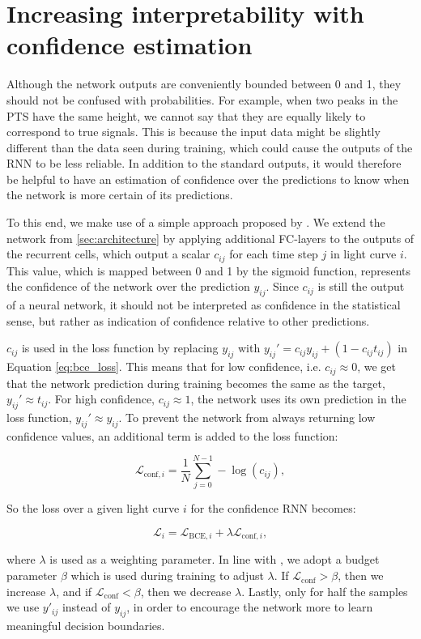 
\section{Increasing interpretability with confidence estimation}

Although the network outputs are conveniently bounded between 0 and 1, they should not be confused with probabilities. For example, when two peaks in the PTS have the same height, we cannot say that they are equally likely to correspond to true signals. This is because the input data might be slightly different than the data seen during training, which could cause the outputs of the RNN to be less reliable. In addition to the standard outputs, it would therefore be helpful to have an estimation of confidence over the predictions to know when the network is more certain of its predictions.

To this end, we make use of a simple approach proposed by \cite{devries2018learning}. We extend the network from \ref{sec:architecture} by applying additional FC-layers to the outputs of the recurrent cells, which output a scalar $c_{ij}$ for each time step $j$ in light curve $i$. This value, which is mapped between 0 and 1 by the sigmoid function, represents the confidence of the network over the prediction $y_{ij}$. Since $c_{ij}$ is still the output of a neural network, it should not be interpreted as confidence in the statistical sense, but rather as indication of confidence relative to other predictions. 

$c_{ij}$ is used in the loss function by replacing $y_{ij}$ with $y_{ij}' = c_{ij} y_{ij} +  (1-c_{ij} t_{ij})$ in Equation \ref{eq:bce_loss}. This means that for low confidence, i.e. $c_{ij} \approx 0$, we get that the network prediction during training becomes the same as the target, $y_{ij}' \approx t_{ij}$. For high confidence, $c_{ij} \approx 1$, the network uses its own prediction in the loss function, $y_{ij}' \approx y_{ij}$. To prevent the network from always returning low confidence values, an additional term is added to the loss function: 

\begin{equation}
    \mathcal{L}_{\text{conf},i} = 
    \frac{1}{N}\sum^{N-1}_{j=0} -\log(c_{ij}),
\end{equation}

\noindent So the loss over a given light curve $i$ for the confidence RNN becomes:

\begin{equation}
    \mathcal{L}_i = \mathcal{L}_{\text{BCE},i} + \lambda \mathcal{L}_{\text{conf},i},
\end{equation}

\noindent where $\lambda$ is used as a weighting parameter. In line with \cite{devries2018learning}, we adopt a budget parameter $\beta$ which is used during training to adjust $\lambda$. If $\mathcal{L}_{\text{conf}} > \beta$, then we increase $\lambda$, and if $\mathcal{L}_{\text{conf}} < \beta$, then we decrease $\lambda$. Lastly, only for half the samples we use $y'_{ij}$ instead of $y_{ij}$, in order to encourage the network more to learn meaningful decision boundaries. 